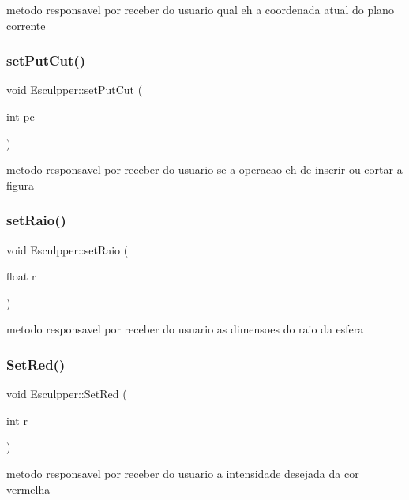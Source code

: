 metodo responsavel por receber do usuario qual eh a coordenada atual do plano corrente \mbox{\label{class_esculpper_a7ba4d36fc926e31737011d344385492c}} 
\subsubsection{\texorpdfstring{setPutCut()}{setPutCut()}}
{\footnotesize\ttfamily void Esculpper\+::set\+Put\+Cut (\begin{DoxyParamCaption}\item[{int}]{pc }\end{DoxyParamCaption})}

metodo responsavel por receber do usuario se a operacao eh de inserir ou cortar a figura \mbox{\label{class_esculpper_ac64b70c52eecda057ecb1ae1278ae110}} 
\subsubsection{\texorpdfstring{setRaio()}{setRaio()}}
{\footnotesize\ttfamily void Esculpper\+::set\+Raio (\begin{DoxyParamCaption}\item[{float}]{r }\end{DoxyParamCaption})}

metodo responsavel por receber do usuario as dimensoes do raio da esfera \mbox{\label{class_esculpper_a839c01344d7da0202eb8cbe81b0e8bfc}} 
\subsubsection{\texorpdfstring{SetRed()}{SetRed()}}
{\footnotesize\ttfamily void Esculpper\+::\+Set\+Red (\begin{DoxyParamCaption}\item[{int}]{r }\end{DoxyParamCaption})}

metodo responsavel por receber do usuario a intensidade desejada da cor vermelha \mbox{\label{class_esculpper_a2cbc4c7888ad77bfbe4977121158cd4d}} 
